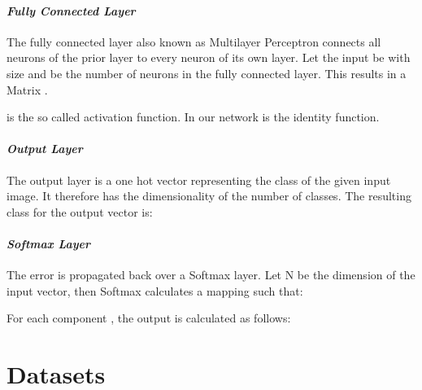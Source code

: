 \documentclass[10pt,journal,compsoc, hidelinks]{IEEEtran}
\newcommand{\paraV}{\vspace{1em}}
\begin{document}
\paraV
\paragraph{\textit{Fully Connected Layer}}

The fully connected layer also known as Multilayer Perceptron connects all neurons of the prior layer to every neuron of its own layer. Let the input be  with size  and  be the number of neurons in the fully connected layer. This results in a Matrix .

\begin{center}
\begin{minipage}{0.4\columnwidth}

\end{minipage}
\end{center}

 is the so called activation function. In our network  is the identity function. 

\paraV
\paragraph{\textit{Output Layer}}
The output layer is a one hot vector representing the class of the given input image. It therefore has the dimensionality of the number of classes. The resulting class for the output vector  is:

\begin{center}
\begin{minipage}{0.65\columnwidth}

\end{minipage}
\end{center}

\paraV
\paragraph{\textit{Softmax Layer}}
The error is propagated back over a Softmax layer. Let N be the dimension of the input vector, then Softmax calculates a mapping such that:


For each component , the output is calculated as follows:

\begin{center}
\begin{minipage}{0.5\columnwidth}

\end{minipage}
\end{center}
 \section{Datasets}
\label{sec:datasets}
\newcommand{\mmiColWidth}{0.15\columnwidth}
\newcommand{\hspacing}{15mm}
\end{document}
